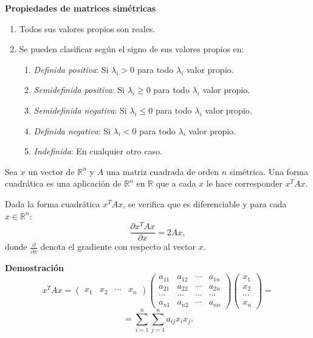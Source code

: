 \textbf{Propiedades de matrices simétricas}
\begin{enumerate}
\item Todos sus valores propios son reales.
\item Se pueden clasificar según el signo de sus valores propios en:
\begin{enumerate}
\item \textit{Definida positiva}: Si $\lambda_i > 0$ para todo $\lambda_i$ valor propio.
\item \textit{Semidefinida positiva}: Si $\lambda_i \geq 0$ para todo $\lambda_i$ valor propio.
\item \textit{Semidefinida negativa}: Si $\lambda_i \leq 0$ para todo $\lambda_i$ valor propio.
\item \textit{Definida negativa}: Si $\lambda_i < 0$ para todo $\lambda_i$ valor propio.
\item \textit{Indefinida}: En cualquier otro caso.
\end{enumerate}
\end{enumerate}

\begin{definicion}
Sea $x$ un vector de $\mathbb{R}^n$ y $A$ una matriz cuadrada de orden $n$ simétrica. Una forma cuadrática es una aplicación de $\mathbb{R}^n$ en $\mathbb{R}$ que a cada $x$ le hace corresponder $x^TAx$.
\end{definicion}

\begin{proposicion}
Dada la forma cuadrática $x^TAx$, se verifica que es diferenciable y para cada $x \in \mathbb{R}^n$:
\[	\frac{\partial x^TAx}{\partial x} = 2Ax,	\]
donde $\frac{\partial}{\partial x}$ denota el gradiente con respecto al vector $x$.
\end{proposicion}
\textbf{Demostración}\\
\[	x^TAx = \left( \begin{array}{cccc}
x_1 & x_2 & \cdots & x_n  \end{array} \right)
\left( \begin{array}{cccc}
a_{11} & a_{12} & \cdots & a_{1n} \\
a_{21} & a_{22} & \cdots & a_{2n} \\
\cdots & \cdots & \cdots & \cdots \\
a_{n1} & a_{n2} & \cdots & a_{nn} \end{array} \right)
\left( \begin{array}{c}
x_1 \\
x_2 \\
\cdots \\
x_n \end{array} \right) =
\]
\[ = \sum_{i=1}^n \sum_{j=1}^n a_{ij}x_ix_j.	\]

